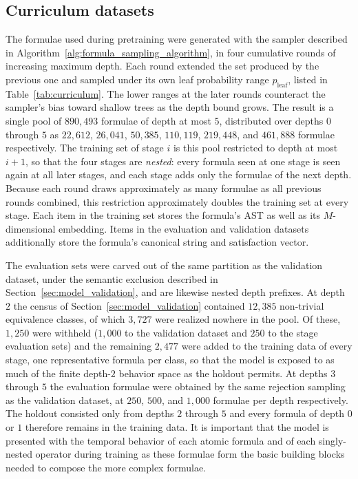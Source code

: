 \documentclass[titlepage,a4paper,11pt]{report}
\begin{document}
    \subsection{Curriculum datasets}\label{sec:curriculum_data}
    The formulae used during pretraining were generated with the sampler described in Algorithm~\ref{alg:formula_sampling_algorithm}, in four cumulative rounds of increasing maximum depth. Each round extended the set produced by the previous one and sampled under its own leaf probability range $p_{\text{leaf}}$, listed in Table~\ref{tab:curriculum}. The lower ranges at the later rounds counteract the sampler's bias toward shallow trees as the depth bound grows. The result is a single pool of $890{,}493$ formulae of depth at most $5$, distributed over depths $0$ through $5$ as $22{,}612$, $26{,}041$, $50{,}385$, $110{,}119$, $219{,}448$, and $461{,}888$ formulae respectively. The training set of stage $i$ is this pool restricted to depth at most $i+1$, so that the four stages are \emph{nested}: every formula seen at one stage is seen again at all later stages, and each stage adds only the formulae of the next depth. Because each round draws approximately as many formulae as all previous rounds combined, this restriction approximately doubles the training set at every stage. Each item in the training set stores the formula's AST as well as its $M$-dimensional embedding. Items in the evaluation and validation datasets additionally store the formula's canonical string and satisfaction vector.
    
    The evaluation sets were carved out of the same partition as the validation dataset, under the semantic exclusion described in Section~\ref{sec:model_validation}, and are likewise nested depth prefixes. At depth $2$ the census of Section~\ref{sec:model_validation} contained $12{,}385$ non-trivial equivalence classes, of which $3{,}727$ were realized nowhere in the pool. Of these, $1{,}250$ were withheld ($1{,}000$ to the validation dataset and $250$ to the stage evaluation sets) and the remaining $2{,}477$ were added to the training data of every stage, one representative formula per class, so that the model is exposed to as much of the finite depth-$2$ behavior space as the holdout permits. At depths $3$ through $5$ the evaluation formulae were obtained by the same rejection sampling as the validation dataset, at $250$, $500$, and $1{,}000$ formulae per depth respectively. The holdout consisted only from depths $2$ through $5$ and every formula of depth $0$ or $1$ therefore remains in the training data. It is important that the model is presented with the temporal behavior of each atomic formula and of each singly-nested operator during training as these formulae form the basic building blocks needed to compose the more complex formulae.
    
\end{document}
